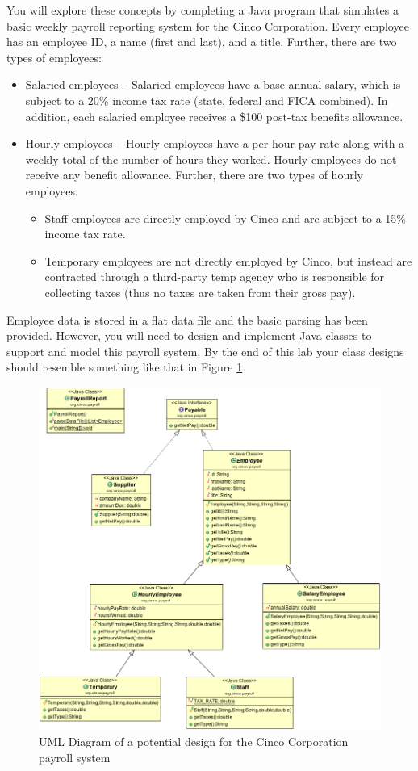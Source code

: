 \documentclass[12pt]{scrartcl}
\begin{document}
You will explore these concepts by completing a Java program that 
simulates a basic weekly payroll reporting system for the Cinco 
Corporation.  Every employee has an employee ID, a name (first and 
last), and a title.  Further, there are two types of employees:
\begin{itemize}
  \item Salaried employees -- Salaried employees have a base annual 
  salary, which is subject to a 20\% income tax rate (state, federal 
  and FICA combined).  In addition, each salaried employee receives 
  a \$100 post-tax benefits allowance.
  \item Hourly employees -- Hourly employees have a per-hour pay rate 
  along with a weekly total of the number of hours they worked.  
  Hourly employees do not receive any benefit allowance.  Further, 
  there are two types of hourly employees.
  \begin{itemize}
    \item Staff employees are directly employed by Cinco and are subject 
    to a 15\% income tax rate.
    \item Temporary employees are not directly employed by Cinco, but 
    instead are contracted through a third-party temp agency who is 
    responsible for collecting taxes (thus no taxes are taken from 
    their gross pay).
  \end{itemize}
\end{itemize}
  
Employee data is stored in a flat data file and the basic parsing has 
been provided.  However, you will need to design and implement Java 
classes to support and model this payroll system.  By the end of this
lab your class designs should resemble something like that in Figure
\ref{figure:uml}.

\begin{figure}[h]
\centering
\includegraphics[scale=.40]{ProjectUML}
\caption{UML Diagram of a potential design for the Cinco Corporation 
payroll system}
\label{figure:uml}
\end{figure}
\end{document}
